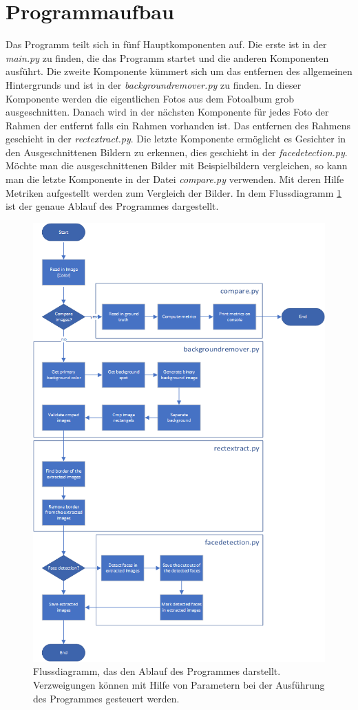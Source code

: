 \section{Programmaufbau}
Das Programm teilt sich in fünf Hauptkomponenten auf. Die erste ist in der \textit{main.py} zu finden, die das Programm startet und die anderen Komponenten ausführt. Die zweite Komponente kümmert sich um das entfernen des allgemeinen Hintergrunds und ist in der \textit{backgroundremover.py} zu finden. In dieser Komponente werden die eigentlichen Fotos aus dem Fotoalbum grob ausgeschnitten. Danach wird in der nächsten Komponente für jedes Foto der Rahmen der entfernt falls ein Rahmen vorhanden ist. Das entfernen des Rahmens geschieht in der \textit{rectextract.py}. Die letzte Komponente ermöglicht es Gesichter in den Ausgeschnittenen Bildern zu erkennen, dies geschieht in der \textit{facedetection.py}. Möchte man die ausgeschnittenen Bilder mit Beispielbildern vergleichen, so kann man die letzte Komponente in der Datei \textit{compare.py} verwenden. Mit deren Hilfe Metriken aufgestellt werden zum Vergleich der Bilder. In dem Flussdiagramm \ref{fig:flowchart} ist der genaue Ablauf des Programmes dargestellt. \\
\begin{figure}
	\centering
	\includegraphics[width=0.8\linewidth]{images/flowchart.png}
	\caption{Flussdiagramm, das den Ablauf des Programmes darstellt. Verzweigungen können mit Hilfe von Parametern bei der Ausführung des Programmes gesteuert werden.}
	\label{fig:flowchart}
\end{figure}
